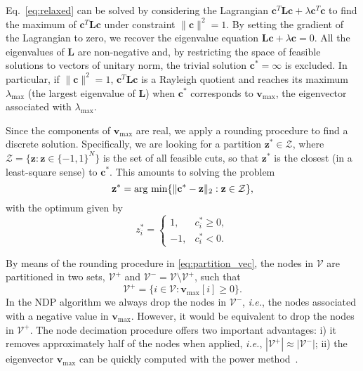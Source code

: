 \documentclass[journal]{IEEEtran}
\def\z{{\mathbf z}}
\def\c{{\mathbf c}}
\def\v{{\mathbf v}}
\def\L{{\mathbf L}}
\newcommand{\argmin}{\operatornamewithlimits{arg\ min}}
\begin{document}
Eq.~\ref{eq:relaxed} can be solved by considering the Lagrangian $\c^T \L \c + \lambda \c^T\c$ to find the maximum of $\c^T \L \c$ under constraint $\| \c \|^2 = 1$. 
By setting the gradient of the Lagrangian to zero, we recover the eigenvalue equation $\L \c + \lambda \c = 0$.
All the eigenvalues of $\L$ are non-negative and, by restricting the space of feasible solutions to vectors of unitary norm, the trivial solution $\c^* = \infty$ is excluded.
In particular, if $\| \c \|^2 = 1$, $\c^T \L \c$ is a Rayleigh quotient and reaches its maximum $\lambda_\text{max}$ (the largest eigenvalue of $\L$) when $\c^*$ corresponds to $\v_\text{max}$, the eigenvector associated with $\lambda_\text{max}$.

Since the components of $\v_\text{max}$ are real, we apply a rounding procedure to find a discrete solution.
Specifically, we are looking for a partition $\z^* \in \mathcal{Z}$, where $\mathcal{Z} = \{\z: \z \in \{-1,1\}^N\}$ is the set of all feasible cuts, so that $\z^*$ is the closest (in a least-square sense) to $\c^*$.
This amounts to solving the problem
\begin{equation}
    \z^* = \argmin \{ \| \c^* - \z \|_2: \z \in \mathcal{Z} \},
\end{equation}
with the optimum given by
\begin{equation}
\label{eq:partition_vec}
    z_i^* = 
    \begin{cases}
    1, & c_i^* \geq 0, \\
    -1, & c_i^* < 0.
    \end{cases}
\end{equation}



By means of the rounding procedure in \eqref{eq:partition_vec}, the nodes in $\mathcal{V}$ are partitioned in two sets, $\mathcal{V}^{+}$ and $\mathcal{V}^{-} = \mathcal{V} \setminus \mathcal{V}^{+}$, such that
\begin{equation}
\label{eq:partition}
    \mathcal{V}^{+} = \{i \in \mathcal{V}: \v_\text{max}[i] \geq 0 \}.
\end{equation}
In the NDP algorithm we always drop the nodes in $\mathcal{V}^{-}$, \textit{i.e.}, the nodes associated with a negative value in $\v_\text{max}$. 
However, it would be equivalent to drop the nodes in $\mathcal{V}^{+}$.
The node decimation procedure offers two important advantages: 
i) it removes approximately half of the nodes when applied, \textit{i.e.}, $|\mathcal{V}^{+}| \approx |\mathcal{V}^{-}|$; 
ii) the eigenvector $\v_\text{max}$ can be quickly computed with the power method~\cite{bianchi2017agent}.
\end{document}
